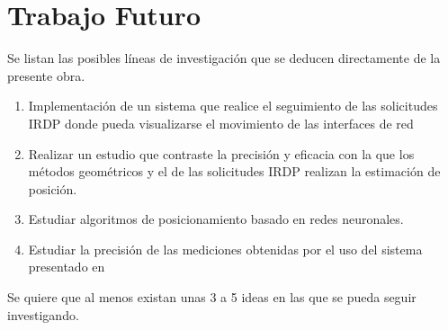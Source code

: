 \section{Trabajo Futuro}
Se listan las posibles líneas de investigación que se deducen directamente de la presente obra.

\begin{enumerate}
\item {Implementación de un sistema que realice el seguimiento de las solicitudes IRDP donde pueda visualizarse el movimiento de las interfaces de red}
\item{Realizar un estudio que contraste la precisión y eficacia con la que los métodos geométricos y el de las solicitudes IRDP realizan la estimación de posición.}
\item{Estudiar algoritmos de posicionamiento basado en redes neuronales.}
\item{Estudiar la precisión de las mediciones obtenidas por el uso del sistema presentado en \cite{8}}
\end{enumerate}

Se quiere que al menos existan unas 3 a 5 ideas en las que se pueda seguir investigando.
